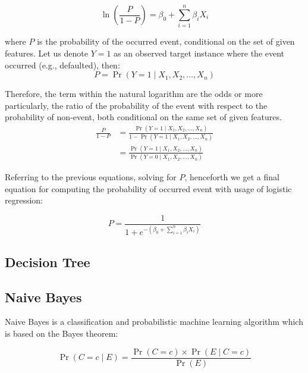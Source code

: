 \begin{equation}\label{eq}
    \ln\left(\frac{P}{1-P}\right) = \beta_0  + \sum_{i=1}^{n} \beta_i X_i
\end{equation}

where $P$ is the probability of the occurred event, conditional on the set of given features. Let us denote $Y=1$ as an observed target instance where the event occurred (e.g., defaulted), then:
\begin{equation}\label{eq}
    P = \operatorname{Pr}(Y=1 \mid X_1,X_2,\ldots,X_n)
\end{equation}

Therefore, the term within the natural logarithm are the odds or more particularly, the ratio of the probability of the event with respect to the probability of non-event, both conditional on the same set of given features.
\begin{equation}\label{eq}
    \begin{aligned}
    \frac{P}{1-P}  {} & = \frac{\operatorname{Pr}(Y=1 \mid X_1,X_2,\ldots,X_n)}{1-\operatorname{Pr}(Y=1 \mid X_1,X_2,\ldots,X_n)} \\
    & = \frac{\operatorname{Pr}(Y=1 \mid X_1,X_2,\ldots,X_n)}{\operatorname{Pr}(Y=0 \mid X_1,X_2,\ldots,X_n)}
\end{aligned}
    \end{equation}

Referring to the previous equations, solving for $P$, henceforth we get a final equation for computing the probability of occurred event with usage of logistic regression:

\begin{equation}\label{eq}
P = \frac{1}{1+e^{-\left(\beta_0 + \displaystyle\sum_{i=1}^{n} \beta_i X_i\right)}}
\end{equation}

\subsection{Decision Tree}
\subsection{Naive Bayes}

Naive Bayes is a classification and probabilistic machine learning algorithm which is based on the Bayes theorem:

\begin{equation}\label{eq}
    \operatorname{Pr}\left(C=c \mid E \right) = \frac{\operatorname{Pr}\left(C=c\right) \times \operatorname{Pr}\left(E \mid C=c\right)}{\operatorname{Pr}\left(E\right)}
\end{equation}

